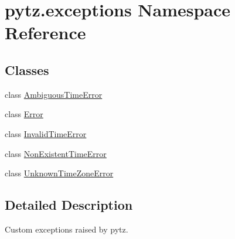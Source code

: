 \hypertarget{namespacepytz_1_1exceptions}{}\section{pytz.\+exceptions Namespace Reference}
\label{namespacepytz_1_1exceptions}
\subsection*{Classes}
\begin{DoxyCompactItemize}
\item 
class \hyperlink{classpytz_1_1exceptions_1_1AmbiguousTimeError}{Ambiguous\+Time\+Error}
\item 
class \hyperlink{classpytz_1_1exceptions_1_1Error}{Error}
\item 
class \hyperlink{classpytz_1_1exceptions_1_1InvalidTimeError}{Invalid\+Time\+Error}
\item 
class \hyperlink{classpytz_1_1exceptions_1_1NonExistentTimeError}{Non\+Existent\+Time\+Error}
\item 
class \hyperlink{classpytz_1_1exceptions_1_1UnknownTimeZoneError}{Unknown\+Time\+Zone\+Error}
\end{DoxyCompactItemize}


\subsection{Detailed Description}
\begin{DoxyVerb}Custom exceptions raised by pytz.
\end{DoxyVerb}
 